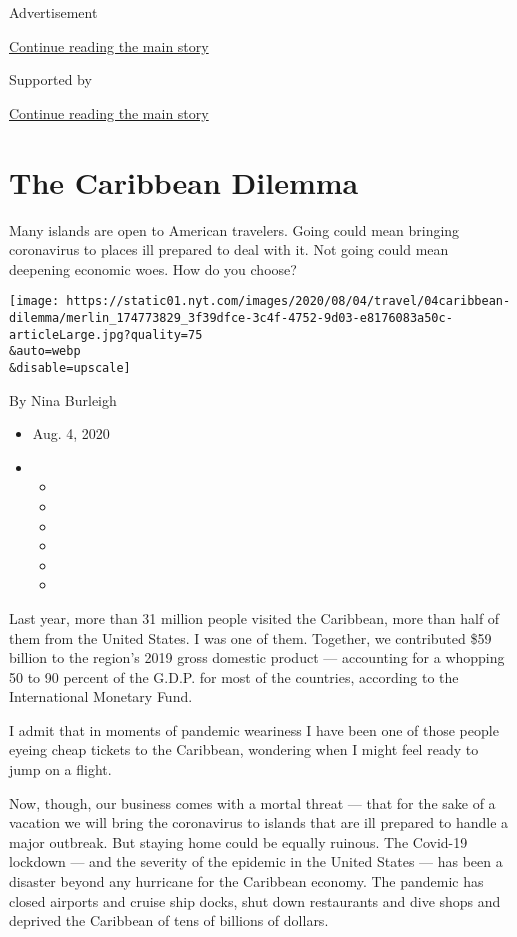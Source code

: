Advertisement

\protect\hyperlink{after-top}{Continue reading the main story}

Supported by

\protect\hyperlink{after-sponsor}{Continue reading the main story}

\hypertarget{the-caribbean-dilemma}{%
\section{The Caribbean Dilemma}\label{the-caribbean-dilemma}}

Many islands are open to American travelers. Going could mean bringing
coronavirus to places ill prepared to deal with it. Not going could mean
deepening economic woes. How do you choose?

\texttt{[image: https://static01.nyt.com/images/2020/08/04/travel/04caribbean-dilemma/merlin\_174773829\_3f39dfce-3c4f-4752-9d03-e8176083a50c-articleLarge.jpg?quality=75\\\&auto=webp\\\&disable=upscale]}

By Nina Burleigh

\begin{itemize}
\item
  Aug. 4, 2020
\item
  \begin{itemize}
  \item
  \item
  \item
  \item
  \item
  \item
  \end{itemize}
\end{itemize}

Last year, more than 31 million people visited the Caribbean, more than
half of them from the United States. I was one of them. Together, we
contributed \$59 billion to the region's 2019 gross domestic product ---
accounting for a whopping 50 to 90 percent of the G.D.P. for most of the
countries, according to the International Monetary Fund.

I admit that in moments of pandemic weariness I have been one of those
people eyeing cheap tickets to the Caribbean, wondering when I might
feel ready to jump on a flight.

Now, though, our business comes with a mortal threat --- that for the
sake of a vacation we will bring the coronavirus to islands that are ill
prepared to handle a major outbreak. But staying home could be equally
ruinous. The Covid-19 lockdown --- and the severity of the epidemic in
the United States --- has been a disaster beyond any hurricane for the
Caribbean economy. The pandemic has closed airports and cruise ship
docks, shut down restaurants and dive shops and deprived the Caribbean
of tens of billions of dollars.

